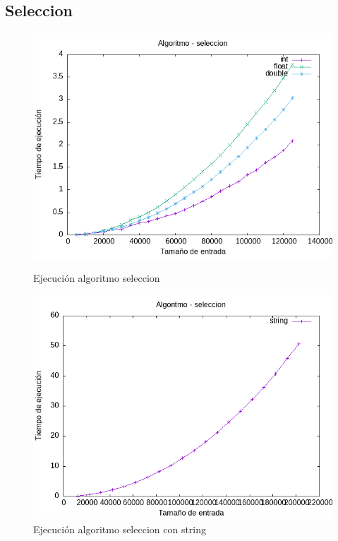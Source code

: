 \documentclass[11pt]{article}
\begin{document}
\subsection*{Seleccion}
\begin{figure}[H]
    \begin{minipage}{0.5\textwidth}
        \centering
        \includegraphics[width=\linewidth]{assets/Img/seleccion.png}
        \caption{Ejecución algoritmo seleccion}
        \label{fig:seleccion}
    \end{minipage}%
    \begin{minipage}{0.5\textwidth}
        \centering
        \includegraphics[width=\linewidth]{assets/Img/seleccionstring.png}
        \caption{Ejecución algoritmo seleccion con string}
        \label{fig:seleccionstring}
    \end{minipage}
\end{figure}
\end{document}
